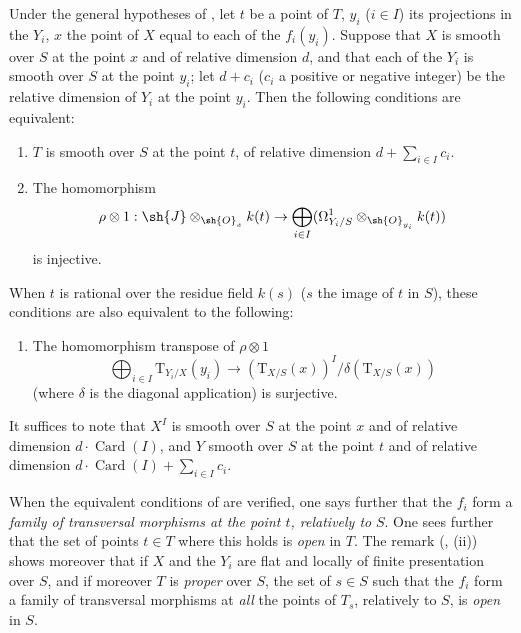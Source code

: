 \begin{corollary}[17.13.10]
\label{IV.17.13.10}
Under the general hypotheses of , let $t$ be a point of $T$, $y_i$ ($i\in I$) its projections in the $Y_i$, $x$ the point of $X$ equal to each of the $f_i(y_i)$.
Suppose that $X$ is smooth over $S$ at the point $x$ and of relative dimension $d$, and that each of the $Y_i$ is smooth over $S$ at the point $y_i$; let $d+c_i$ ($c_i$ a positive or negative integer) be the relative dimension of $Y_i$ at the point $y_i$.
Then the following conditions are equivalent:
\begin{enumerate}[label=\alph*)]
  \item $T$ is smooth over $S$ at the point $t$, of relative dimension $d+\sum_{i\in I} c_i$.
  \item The homomorphism
  \[
    \rho\otimes 1: \sh{J}\otimes_{\sh{O}_x}k(t) \to \bigoplus_{i\in I}(\Omega^1_{Y_i/S}\otimes_{\sh{O}_{y_i}}k(t))
  \]
  is injective.
\end{enumerate}
When $t$ is rational over the residue field $k(s)$ ($s$ the image of $t$ in $S$), these conditions are also equivalent to the following:
\begin{enumerate}
  \item[b${}'$)] The homomorphism transpose of $\rho\otimes 1$
  \[
    \bigoplus_{i\in I}\mathrm{T}_{Y_i/X}(y_i) \to (\mathrm{T}_{X/S}(x))^I/\delta(\mathrm{T}_{X/S}(x))
  \]
  (where $\delta$ is the diagonal application) is surjective.
\end{enumerate}
It suffices to note that $X^I$ is smooth over $S$ at the point $x$ and of relative dimension $d\cdot\operatorname{Card}(I)$, and $Y$ smooth over $S$ at the point $t$ and of relative dimension $d\cdot\operatorname{Card}(I)+\sum_{i\in I} c_i$.

When the equivalent conditions of  are verified, one says further that the $f_i$ form a \emph{family of transversal morphisms at the point $t$, relatively to} $S$.
One sees further that the set of points $t\in T$ where this holds is \emph{open} in $T$.
The remark (, (ii)) shows moreover that if $X$ and the $Y_i$ are flat and locally of finite presentation over $S$, and if moreover $T$ is \emph{proper} over $S$, the set of $s\in S$ such that the $f_i$ form a family of transversal morphisms at \emph{all} the points of $T_s$, relatively to $S$, is \emph{open} in $S$.
\end{corollary}

